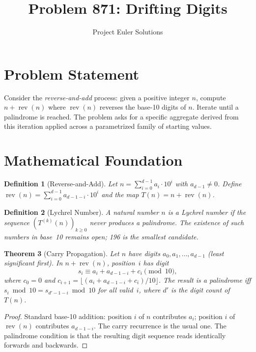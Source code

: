 \documentclass[11pt]{article}
\title{Problem 871: Drifting Digits}
\author{Project Euler Solutions}
\date{}
\newtheorem{theorem}{Theorem}
\newtheorem{definition}[theorem]{Definition}
\begin{document}
\maketitle

\section{Problem Statement}

Consider the \emph{reverse-and-add} process: given a positive integer $n$, compute $n + \operatorname{rev}(n)$ where $\operatorname{rev}(n)$ reverses the base-10 digits of $n$. Iterate until a palindrome is reached. The problem asks for a specific aggregate derived from this iteration applied across a parametrized family of starting values.

\section{Mathematical Foundation}

\begin{definition}[Reverse-and-Add]
Let $n = \sum_{i=0}^{d-1} a_i \cdot 10^i$ with $a_{d-1} \neq 0$. Define $\operatorname{rev}(n) = \sum_{i=0}^{d-1} a_{d-1-i} \cdot 10^i$ and the map $T(n) = n + \operatorname{rev}(n)$.
\end{definition}

\begin{definition}[Lychrel Number]
A natural number $n$ is a \emph{Lychrel number} if the sequence $(T^{(k)}(n))_{k \ge 0}$ never produces a palindrome. The existence of such numbers in base~10 remains open; 196 is the smallest candidate.
\end{definition}

\begin{theorem}[Carry Propagation]
Let $n$ have digits $a_0, a_1, \ldots, a_{d-1}$ (least significant first). In $n + \operatorname{rev}(n)$, position~$i$ has digit
\[
s_i \equiv a_i + a_{d-1-i} + c_i \pmod{10},
\]
where $c_0 = 0$ and $c_{i+1} = \lfloor (a_i + a_{d-1-i} + c_i)/10 \rfloor$. The result is a palindrome iff $s_i \bmod 10 = s_{d'-1-i} \bmod 10$ for all valid~$i$, where $d'$ is the digit count of $T(n)$.
\end{theorem}

\begin{proof}
Standard base-10 addition: position $i$ of $n$ contributes $a_i$; position $i$ of $\operatorname{rev}(n)$ contributes $a_{d-1-i}$. The carry recurrence is the usual one. The palindrome condition is that the resulting digit sequence reads identically forwards and backwards.
\end{proof}
\end{document}
